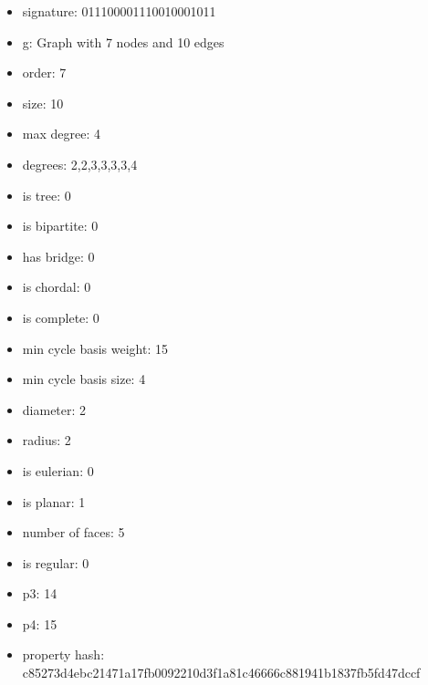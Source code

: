 \begin{itemize}
\item signature: 011100001110010001011
\item g: Graph with 7 nodes and 10 edges
\item order: 7
\item size: 10
\item max degree: 4
\item degrees: 2,2,3,3,3,3,4
\item is tree: 0
\item is bipartite: 0
\item has bridge: 0
\item is chordal: 0
\item is complete: 0
\item min cycle basis weight: 15
\item min cycle basis size: 4
\item diameter: 2
\item radius: 2
\item is eulerian: 0
\item is planar: 1
\item number of faces: 5
\item is regular: 0
\item p3: 14
\item p4: 15
\item property hash: c85273d4ebc21471a17fb0092210d3f1a81c46666c881941b1837fb5fd47dccf
\end{itemize}
\newpage
\begin{figure}
\end{figure}
